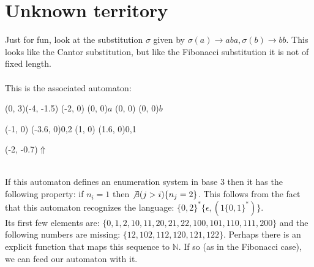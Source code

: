 \documentclass{article}
\begin{document}
\section*{Unknown territory}
Just for fun, look at the substitution $\sigma$ given by 
$\sigma(a) \to aba, \sigma(b) \to bb$. This looks like the 
Cantor substitution, but like the Fibonacci substitution it is not of fixed 
length.\\
\\
This is the associated automaton:\\
\begin{graph}(0, 3)(-4, -1.5)
  (-2, 0) (0, 0){$a$}
  (0, 0)  (0, 0){$b$}

  (-1, 0) \freetext(-3.6, 0){0,2}
   
  (1, 0) \freetext(1.6, 0){0,1}

  \freetext(-2, -0.7){$\Uparrow$}
\end{graph}\\
If this automaton defines an enumeration system in base 3 then it has the 
following property: if $n_i = 1$ then $\not\exists (j > i) \{ n_j = 2\}$. This 
follows from the fact that this automaton recognizes the language:
$\{0, 2\}^* \{\epsilon, (1\{0, 1\}^*)\}$.\\
Its first few elements are:
$\{0, 1, 2, 10, 11, 20, 21, 22, 100, 101, 110, 111, 200\}$ and the following 
numbers are missing: $\{12, 102, 112, 120, 121, 122\}$. Perhaps there is an 
explicit function that maps this sequence to $\mathbb{N}$. If so (as in the 
Fibonacci case), we can feed our automaton with it.\\
\end{document}
